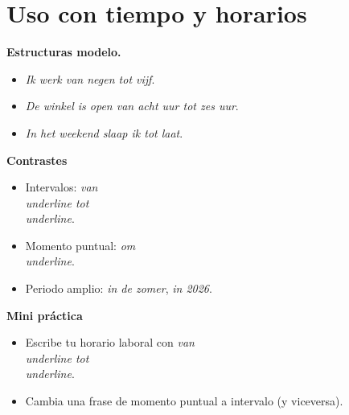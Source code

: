 \section{Uso con tiempo y horarios}
\textbf{Estructuras modelo.}
\begin{itemize}[leftmargin=*]
  \item \textit{Ik werk van negen tot vijf}.
  \item \textit{De winkel is open van acht uur tot zes uur}.
  \item \textit{In het weekend slaap ik tot laat}.
\end{itemize}

\textbf{Contrastes}
\begin{itemize}[leftmargin=*]
  \item Intervalos: \textit{van \\underline{\hspace{1.2cm}} tot \\underline{\hspace{1.2cm}}}.
  \item Momento puntual: \textit{om \\underline{\hspace{1.2cm}}}.
  \item Periodo amplio: \textit{in de zomer}, \textit{in 2026}.
\end{itemize}

\textbf{Mini práctica}
\begin{itemize}[leftmargin=*]
  \item Escribe tu horario laboral con \textit{van \\underline{\hspace{1.2cm}} tot \\underline{\hspace{1.2cm}}}.
  \item Cambia una frase de momento puntual a intervalo (y viceversa).
\end{itemize}
